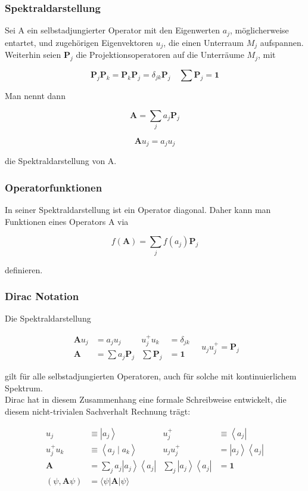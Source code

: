 \documentclass[10pt, letterpaper]{article}
\begin{document}
\subsubsection*{Spektraldarstellung}
Sei A ein selbstadjungierter Operator mit den Eigenwerten $a_{j}$, möglicherweise entartet, und zugehörigen Eigenvektoren $u_{j}$, die einen Unterraum $M_{j}$ aufspannen. Weiterhin seien $\mathbf{P}_{j}$ die Projektionsoperatoren auf die Unterräume $M_{j}$, mit

$$
\mathbf{P}_{j} \mathbf{P}_{k}=\mathbf{P}_{k} \mathbf{P}_{j}=\delta_{j k} \mathbf{P}_{j} \quad \sum \mathbf{P}_{j}=\mathbf{1}
$$

Man nennt dann

$$
\mathbf{A}=\sum_{j} a_{j} \mathbf{P}_{j}
$$

$$
\mathbf{A} u_{j}=a_{j} u_{j}
$$

die Spektraldarstellung von A.

\subsubsection*{Operatorfunktionen}
In seiner Spektraldarstellung ist ein Operator diagonal. Daher kann man Funktionen eines Operators A via

$$
f(\mathbf{A})=\sum_{j} f\left(a_{j}\right) \mathbf{P}_{j}
$$

definieren.

\subsubsection*{Dirac Notation}
Die Spektraldarstellung

$$
\begin{aligned}
\mathbf{A} u_{j} & =a_{j} u_{j} & u_{j}^{+} u_{k} & =\delta_{j k} \\
\mathbf{A} & =\sum a_{j} \mathbf{P}_{j} & \sum \mathbf{P}_{j} & =\mathbf{1}
\end{aligned} \quad u_{j} u_{j}^{+}=\mathbf{P}_{j}
$$

gilt für alle selbstadjungierten Operatoren, auch für solche mit kontinuierlichem Spektrum.\\
Dirac hat in diesem Zusammenhang eine formale Schreibweise entwickelt, die diesem nicht-trivialen Sachverhalt Rechnung trägt:

$$
\begin{aligned}
u_{j} & \equiv\left|a_{j}\right\rangle & u_{j}^{+} & \equiv\left\langle a_{j}\right| \\
u_{j}^{+} u_{k} & \equiv\left\langle a_{j} \mid a_{k}\right\rangle & u_{j} u_{j}^{+} & =\left|a_{j}\right\rangle\left\langle a_{j}\right| \\
\mathbf{A} & =\sum_{j} a_{j}\left|a_{j}\right\rangle\left\langle a_{j}\right| & \sum_{j}\left|a_{j}\right\rangle\left\langle a_{j}\right| & =\mathbf{1} \\
(\psi, \mathbf{A} \psi) & =\langle\psi| \mathbf{A}|\psi\rangle & &
\end{aligned}
$$
\end{document}
